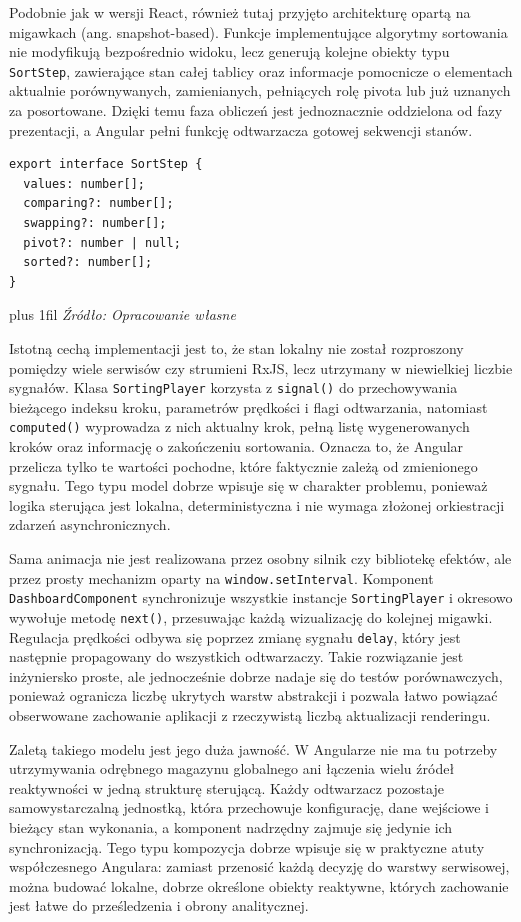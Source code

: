 \documentclass[12pt,openright,twoside]{report}
\newcommand{\source}[1]{{\par\vspace{5pt}\noindent\leftskip=0pt \rightskip=0pt \parfillskip=0pt plus 1fil \footnotesize\textit{Źródło: #1}\par}}
\begin{document}
Podobnie jak w wersji React, również tutaj przyjęto architekturę opartą na migawkach (ang. snapshot-based). Funkcje implementujące algorytmy sortowania nie modyfikują bezpośrednio widoku, lecz generują kolejne obiekty typu \texttt{SortStep}, zawierające stan całej tablicy oraz informacje pomocnicze o elementach aktualnie porównywanych, zamienianych, pełniących rolę pivota lub już uznanych za posortowane. Dzięki temu faza obliczeń jest jednoznacznie oddzielona od fazy prezentacji, a Angular pełni funkcję odtwarzacza gotowej sekwencji stanów.

\begin{lstlisting}[language=tsx, caption={Struktura interfejsu opisująca krok wizualizacji w Angularze.}, label={lst:angular-step-interface}]
export interface SortStep {
  values: number[];
  comparing?: number[];
  swapping?: number[];
  pivot?: number | null;
  sorted?: number[];
}
\end{lstlisting}
\source{Opracowanie własne}

Istotną cechą implementacji jest to, że stan lokalny nie został rozproszony pomiędzy wiele serwisów czy strumieni RxJS, lecz utrzymany w niewielkiej liczbie sygnałów. Klasa \texttt{SortingPlayer} korzysta z \texttt{signal()} do przechowywania bieżącego indeksu kroku, parametrów prędkości i flagi odtwarzania, natomiast \texttt{computed()} wyprowadza z nich aktualny krok, pełną listę wygenerowanych kroków oraz informację o zakończeniu sortowania. Oznacza to, że Angular przelicza tylko te wartości pochodne, które faktycznie zależą od zmienionego sygnału. Tego typu model dobrze wpisuje się w charakter problemu, ponieważ logika sterująca jest lokalna, deterministyczna i nie wymaga złożonej orkiestracji zdarzeń asynchronicznych.

Sama animacja nie jest realizowana przez osobny silnik czy bibliotekę efektów, ale przez prosty mechanizm oparty na \texttt{window.setInterval}. Komponent \texttt{DashboardComponent} synchronizuje wszystkie instancje \texttt{SortingPlayer} i okresowo wywołuje metodę \texttt{next()}, przesuwając każdą wizualizację do kolejnej migawki. Regulacja prędkości odbywa się poprzez zmianę sygnału \texttt{delay}, który jest następnie propagowany do wszystkich odtwarzaczy. Takie rozwiązanie jest inżyniersko proste, ale jednocześnie dobrze nadaje się do testów porównawczych, ponieważ ogranicza liczbę ukrytych warstw abstrakcji i pozwala łatwo powiązać obserwowane zachowanie aplikacji z rzeczywistą liczbą aktualizacji renderingu.

Zaletą takiego modelu jest jego duża jawność. W Angularze nie ma tu potrzeby utrzymywania odrębnego magazynu globalnego ani łączenia wielu źródeł reaktywności w jedną strukturę sterującą. Każdy odtwarzacz pozostaje samowystarczalną jednostką, która przechowuje konfigurację, dane wejściowe i bieżący stan wykonania, a komponent nadrzędny zajmuje się jedynie ich synchronizacją. Tego typu kompozycja dobrze wpisuje się w praktyczne atuty współczesnego Angulara: zamiast przenosić każdą decyzję do warstwy serwisowej, można budować lokalne, dobrze określone obiekty reaktywne, których zachowanie jest łatwe do prześledzenia i obrony analitycznej.
\end{document}
